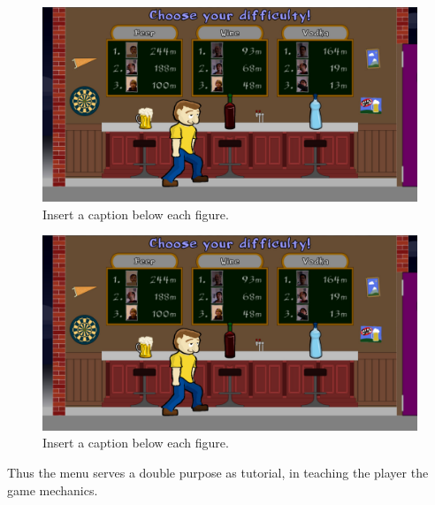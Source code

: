 \documentclass{chi-ext}
\begin{document}
{\begin{figure}
  \centering
  \includegraphics[width=\linewidth]{pictures/screenshot2.jpg}
  \caption{Insert a caption below each figure.}
  \label{fig:screenshot3}
\end{figure}
\begin{figure}
  \centering
  \includegraphics[width=\linewidth]{pictures/screenshot2.jpg}
  \caption{Insert a caption below each figure.}
  \label{fig:screenshot4}
\end{figure}
}
Thus the menu serves a double purpose as tutorial, in teaching the player the game mechanics.
\end{document}
